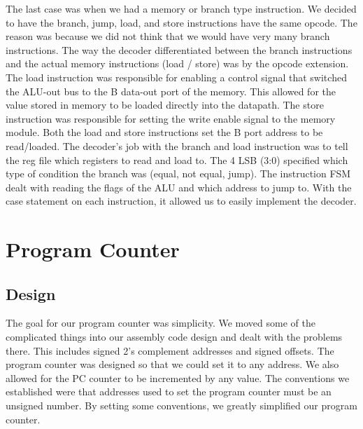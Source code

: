 \documentclass[letterpaper, 11 pt, conference]{article}
\begin{document}
The last case was when we had a memory or branch type instruction. We decided to have the branch, jump, load, and store instructions have the same opcode. The reason was because we did not think that we would have very many branch instructions. The way the decoder differentiated between the branch instructions and the actual memory instructions (load / store) was by the opcode extension. The load instruction was responsible for enabling a control signal that switched the ALU-out bus to the B data-out port of the memory. This allowed for the value stored in memory to be loaded directly into the datapath. The store instruction was responsible for setting the write enable signal to the memory module. Both the load and store instructions set the B port address to be read/loaded. The decoder’s job with the branch and load instruction was to tell the reg file which registers to read and load to. The 4 LSB (3:0) specified which type of condition the branch was (equal, not equal, jump). The instruction FSM dealt with reading the flags of the ALU and which address to jump to. With the case statement on each instruction, it allowed us to easily implement the decoder.



\section{Program Counter}
\subsection{Design}
The goal for our program counter was simplicity. We moved some of the complicated things into our assembly code design and dealt with the problems there. This includes signed 2’s complement addresses and signed offsets. The program counter was designed so that we could set it to any address. We also allowed for the PC counter to be incremented by any value. The conventions we established were that addresses used to set the program counter must be an unsigned number. By setting some conventions, we greatly simplified our program counter.
\end{document}
